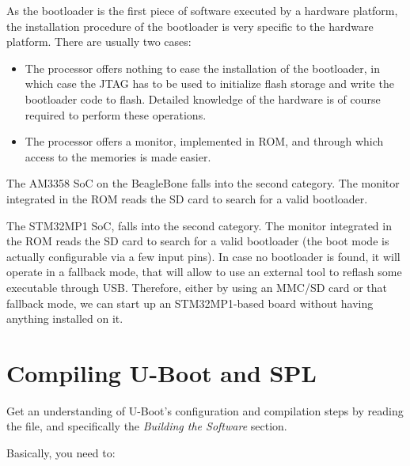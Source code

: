 
As the bootloader is the first piece of software executed by a
hardware platform, the installation procedure of the bootloader is
very specific to the hardware platform. There are usually two cases:

\begin{itemize}

\item The processor offers nothing to ease the installation of the
  bootloader, in which case the JTAG has to be used to initialize
  flash storage and write the bootloader code to flash. Detailed
  knowledge of the hardware is of course required to perform these
  operations.

\item The processor offers a monitor, implemented in ROM, and through
  which access to the memories is made easier.

\end{itemize}

{
The AM3358 SoC on the BeagleBone falls into the second category. The monitor
integrated in the ROM reads the SD card to search for a valid
bootloader.
}{}

{
The STM32MP1 SoC, falls into the second category. The monitor
integrated in the ROM reads the SD card to search for a valid
bootloader (the boot mode is actually configurable via a few input
pins). In case no bootloader is found, it will operate in a fallback
mode, that will allow to use an external tool to reflash some
executable through USB. Therefore, either by using an MMC/SD card or
that fallback mode, we can start up an STM32MP1-based board without
having anything installed on it.
}{}

\section{Compiling U-Boot and SPL}

Get an understanding of U-Boot's configuration and compilation steps
by reading the  file, and specifically the {\em Building
the Software} section.

Basically, you need to:

